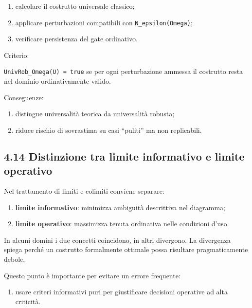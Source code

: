 \begin{enumerate}
\def\labelenumi{\arabic{enumi}.}
\tightlist
\item
  calcolare il costrutto universale classico;
\item
  applicare perturbazioni compatibili con \texttt{N\_epsilon(Omega)};
\item
  verificare persistenza del gate ordinativo.
\end{enumerate}

Criterio:

\texttt{UnivRob\_Omega(U)\ =\ true} se per ogni perturbazione ammessa il costrutto resta nel dominio ordinativamente valido.

Conseguenze:

\begin{enumerate}
\def\labelenumi{\arabic{enumi}.}
\tightlist
\item
  distingue universalità teorica da universalità robusta;
\item
  riduce rischio di sovrastima su casi ``puliti'' ma non replicabili.
\end{enumerate}

\subsection{4.14 Distinzione tra limite informativo e limite operativo}

Nel trattamento di limiti e colimiti conviene separare:

\begin{enumerate}
\def\labelenumi{\arabic{enumi}.}
\tightlist
\item
  \textbf{limite informativo}: minimizza ambiguità descrittiva nel diagramma;
\item
  \textbf{limite operativo}: massimizza tenuta ordinativa nelle condizioni d'uso.
\end{enumerate}

In alcuni domini i due concetti coincidono, in altri divergono. La divergenza spiega perché un costrutto formalmente ottimale possa risultare pragmaticamente debole.

Questo punto è importante per evitare un errore frequente:

\begin{enumerate}
\def\labelenumi{\arabic{enumi}.}
\tightlist
\item
  usare criteri informativi puri per giustificare decisioni operative ad alta criticità.
\end{enumerate}


